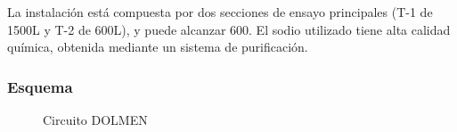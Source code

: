 \documentclass{article}
\begin{document}
La instalación está compuesta por dos secciones de ensayo principales (T-1 de 1500L y T-2 de 600L), y puede alcanzar 600\celsius. El sodio utilizado tiene alta calidad química, obtenida mediante un sistema de purificación.
\subsubsection*{Esquema}
\begin{figure}[H]
\begin{center}
\end{center}
\caption{Circuito DOLMEN}
\end{figure}
\end{document}
